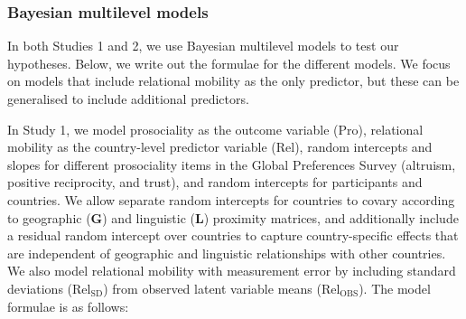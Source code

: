 \documentclass[english,man,floatsintext]{apa6}
\begin{document}
\hypertarget{bayesian-multilevel-models}{%
\subsubsection{Bayesian multilevel models}\label{bayesian-multilevel-models}}

In both Studies 1 and 2, we use Bayesian multilevel models to test our hypotheses. Below, we write out the formulae for the different models. We focus on models that include relational mobility as the only predictor, but these can be generalised to include additional predictors.

In Study 1, we model prosociality as the outcome variable (\(\text{Pro}\)), relational mobility as the country-level predictor variable (\(\text{Rel}\)), random intercepts and slopes for different prosociality items in the Global Preferences Survey (altruism, positive reciprocity, and trust), and random intercepts for participants and countries. We allow separate random intercepts for countries to covary according to geographic (\(\textbf{G}\)) and linguistic (\(\textbf{L}\)) proximity matrices, and additionally include a residual random intercept over countries to capture country-specific effects that are independent of geographic and linguistic relationships with other countries. We also model relational mobility with measurement error by including standard deviations (\(\text{Rel}_{\text{SD}}\)) from observed latent variable means (\(\text{Rel}_{\text{OBS}}\)). The model formulae is as follows:
\end{document}

